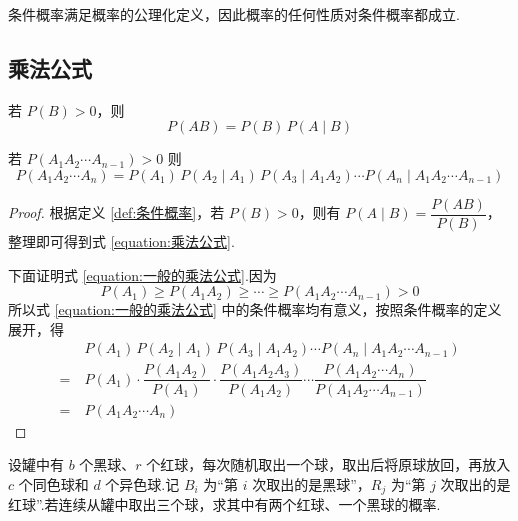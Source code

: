 \begin{note}
    \indent 条件概率满足概率的公理化定义，因此概率的任何性质对条件概率都成立.
\end{note}

\subsection{乘法公式}

\begin{theorem}[][乘法公式]
    \indent 若 $P(B)>0$，则
    \begin{equation} \label{equation:乘法公式}
        P(AB) = P(B) \, P(A \mid B)    
    \end{equation}
    
    若 $P(A_1 A_2 \cdots A_{n-1}) > 0$ 则
    \begin{equation} \label{equation:一般的乘法公式}
        P(A_1 A_2 \cdots A_n) = P(A_1) \, P(A_2 \mid A_1) \, P(A_3 \mid A_1 A_2) \cdots P(A_n \mid A_1 A_2 \cdots A_{n-1})
    \end{equation}
\end{theorem}

\begin{proof}
    根据定义 \ref{def:条件概率}，若 $P(B)>0$，则有 $P(A \mid B) = \dfrac{P(AB)}{P(B)}$，整理即可得到式 \eqref{equation:乘法公式}.

    下面证明式 \eqref{equation:一般的乘法公式}.因为
    $$
    P(A_1) \geqslant P(A_1 A_2) \geqslant \cdots \geqslant P(A_1 A_2 \cdots A_{n-1}) > 0
    $$
    所以式 \eqref{equation:一般的乘法公式} 中的条件概率均有意义，按照条件概率的定义展开，得
    $$
    \begin{aligned}
        & P(A_1) \, P(A_2 \mid A_1) \, P(A_3 \mid A_1 A_2) \cdots P(A_n \mid A_1 A_2 \cdots A_{n-1}) \\
        =\ & P(A_1) \cdot \dfrac{P(A_1 A_2)}{P(A_1)} \cdot \dfrac{P(A_1 A_2 A_3)}{P(A_1 A_2)} \cdots \dfrac{P(A_1 A_2 \cdots A_n)}{P(A_1 A_2 \cdots A_{n-1})} \\
        =\ & P(A_1 A_2 \cdots A_n)
    \end{aligned}
    $$
\end{proof}

\begin{example}[][波利亚罐子模型]
    \indent 设罐中有 $b$ 个黑球、$r$ 个红球，每次随机取出一个球，取出后将原球放回，再放入 $c$ 个同色球和 $d$ 个异色球.记 $B_i$ 为“第 $i$ 次取出的是黑球”，$R_j$ 为“第 $j$ 次取出的是红球”.若连续从罐中取出三个球，求其中有两个红球、一个黑球的概率.
\end{example}

